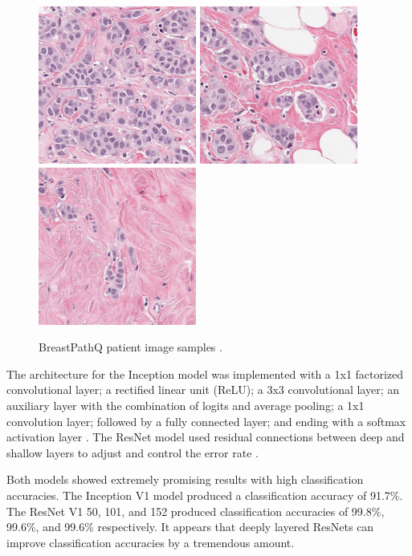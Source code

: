 \documentclass[11pt]{ieeeconf}
\begin{document}
\begin{figure}[tb]
  \centering
  \includegraphics[width=14em]{99791_1.png}
  \includegraphics[width=14em]{99791_16.png}
  \includegraphics[width=14em]{99791_29.png}
  \caption{BreastPathQ patient image samples \cite{spie}.}
  \label{fig:samples}
\end{figure}

The architecture for the Inception model was implemented with a 1x1 factorized convolutional layer; a rectified linear unit (ReLU); a 3x3 convolutional layer; an auxiliary layer with the combination of logits and average pooling;  a 1x1 convolution layer;  followed by a fully connected layer; and ending with a softmax activation layer \cite{hamidreza}. The ResNet model used residual connections between deep and shallow layers to adjust and control the error rate \cite{hamidreza}.

Both models showed extremely promising results with high classification accuracies. The Inception V1 model produced a classification accuracy of 91.7\%. The ResNet V1 50, 101, and 152 produced classification accuracies of 99.8\%, 99.6\%, and 99.6\% respectively. It appears that deeply layered ResNets can improve classification accuracies by a tremendous amount.
\end{document}
